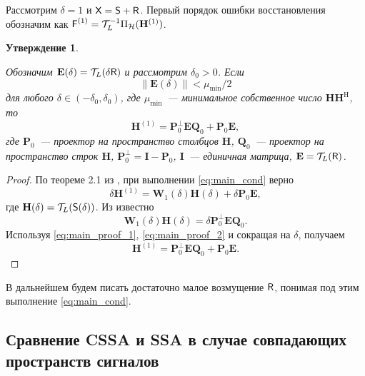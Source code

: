 \documentclass[specialist,
               substylefile = spbu.rtx,
               subf,href,colorlinks=true, 12pt]{disser}
\newtheorem{statement}{Утверждение}
\begin{document}
Рассмотрим $\delta = 1$ и $\textsf{X} = \textsf{S} + \textsf{R}$. Первый порядок ошибки восстановления обозначим как $\textsf{F}^{(1)} = \mathcal{T}_L^{-1} \Pi_{\mathcal{H}}(\mathbf{H}^{(1)})$.

\begin{statement} \label{st:main}
	
	Обозначим $\mathbf{E}(\delta) = \mathcal{T}_L(\delta \textsf{R})$ и рассмотрим $\delta_0 > 0$. Если
	\begin{equation} \label{eq:main_cond}
		\|\mathbf{E}(\delta)\| < \mu_{\min} / 2
	\end{equation}
	для любого $\delta \in (-\delta_0, \delta_0)$, где $\mu_{\min}$~--- минимальное собственное число $\mathbf{H}\mathbf{H}^\mathrm{H}$, то
\begin{equation} \label{eq:main}
	\mathbf{H}^{(1)} = \mathbf{P}^{\perp}_0 \mathbf{E} \mathbf{Q}_0 + \mathbf{P}_0 \mathbf{E},
\end{equation}
где $\mathbf{P}_0$~--- проектор на пространство столбцов $\mathbf{H}$, $\mathbf{Q}_0$~--- проектор на пространство строк $\mathbf{H}$, $\mathbf{P}^{\perp}_0 = \mathbf{I} - \mathbf{P}_0$, $\mathbf{I}$~--- единичная матрица, $\mathbf{E} = \mathcal{T}_L(\textsf{R})$.
\end{statement}
\begin{proof}
	
По теореме 2.1 из \cite{Nekrutkin}, при выполнении \eqref{eq:main_cond} верно
\begin{equation} \label{eq:main_proof_1}
\delta\mathbf{H}^{(1)} = \mathbf{W}_1(\delta) \mathbf{H}(\delta) + \delta \mathbf{P}_0 \mathbf{E},
\end{equation}
где $\mathbf{H}(\delta) = \mathcal{T}_L(\textsf{S}(\delta))$.
Из \cite[стр.12]{Konstantinov} известно
\begin{equation} \label{eq:main_proof_2}
	\mathbf{W}_1(\delta) \mathbf{H}(\delta) = \delta \mathbf{P}^{\perp}_0 \mathbf{E} \mathbf{Q}_0.
\end{equation}
Используя \eqref{eq:main_proof_1}, \eqref{eq:main_proof_2} и сокращая на $\delta$, получаем
\begin{equation*}
	\mathbf{H}^{(1)} = \mathbf{P}^{\perp}_0 \mathbf{E} \mathbf{Q}_0 + \mathbf{P}_0 \mathbf{E}.
\end{equation*}
\end{proof}

В дальнейшем будем писать достаточно малое возмущение $\textsf{R}$, понимая под этим выполнение \eqref{eq:main_cond}.

\subsection{Сравнение CSSA и SSA в случае совпадающих пространств сигналов}
\end{document}
